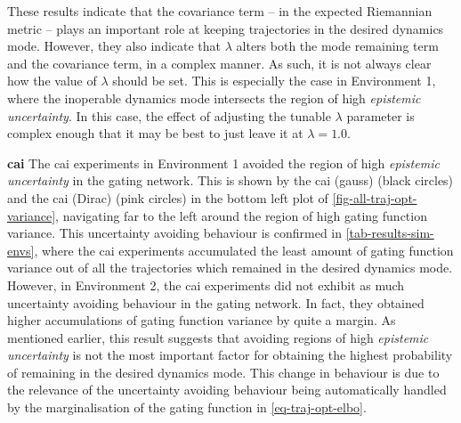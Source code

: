 \documentclass{mimosis-class/mimosis}
\numberwithin{equation}{chapter}
\begin{document}
{These results indicate that the covariance term -- in the expected Riemannian metric -- plays an important role
at keeping trajectories in the desired dynamics mode.
However, they also indicate that \(\lambda\) alters both the mode remaining term and the covariance term,
in a complex manner.
As such, it is not always clear how the value of \(\lambda\) should be set.
This is especially the case in Environment 1,
where the inoperable dynamics mode intersects the region of high \emph{epistemic uncertainty}.
In this case, the effect of adjusting the tunable \(\lambda\) parameter is complex enough that it may
be best to just leave it at \(\lambda=1.0\).


\newline

\textbf{\acrfull{cai}}
The \acrshort{cai} experiments in Environment 1
avoided the region of high \emph{epistemic uncertainty} in the gating network.
This is shown by the \acrshort{cai} (gauss) (black circles) and the \acrshort{cai} (Dirac) (pink circles) in the bottom left plot
of \cref{fig-all-traj-opt-variance}, navigating far to the left around the region of high gating function variance.
This uncertainty avoiding behaviour is confirmed in \cref{tab-results-sim-envs},
where the \acrshort{cai} experiments accumulated the least amount of gating function variance out
of all the trajectories which remained in the desired dynamics mode.
However, in Environment 2, the \acrshort{cai} experiments
did not exhibit as much uncertainty avoiding behaviour in the gating network.
In fact, they obtained higher accumulations of gating function variance by quite a margin.
As mentioned earlier, this result suggests that avoiding regions of high \emph{epistemic uncertainty} is not the most
important factor for obtaining the highest probability of remaining in the desired dynamics mode.
This change in behaviour is due to the relevance of the uncertainty avoiding behaviour being automatically
handled by the marginalisation of the gating function in \cref{eq-traj-opt-elbo}.


}
\end{document}
